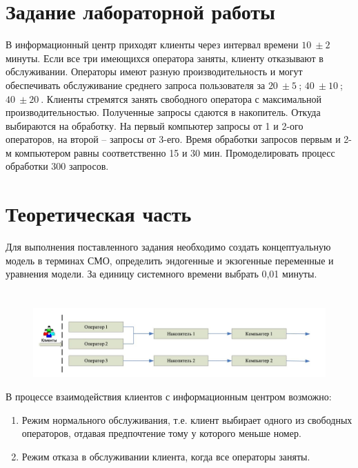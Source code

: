 \documentclass[12pt,a4paper,oneside]{report}
\begin{document}
\section*{Задание лабораторной работы}
\quad В информационный центр приходят клиенты через интервал времени $\SI{10}{} \pm \SI{2}{}$ минуты. Если все три имеющихся оператора заняты, клиенту отказывают в обслуживании. Операторы имеют разную производительность и могут обеспечивать обслуживание среднего запроса пользователя за $\SI{20}{} \pm \SI{5}{}$; $\SI{40}{} \pm \SI{10}{}$; $\SI{40}{} \pm \SI{20}{}$. Клиенты стремятся занять свободного оператора с максимальной производительностью. Полученные запросы сдаются в накопитель. Откуда выбираются на обработку. На первый компьютер запросы от 1 и 2-ого операторов, на второй – запросы от 3-его. Время обработки запросов первым и 2-м компьютером равны соответственно 15 и 30 мин. Промоделировать процесс обработки 300 запросов. 


\section*{Теоретическая часть}
\quad Для выполнения поставленного задания необходимо создать концептуальную модель в терминах СМО, определить эндогенные и экзогенные переменные и уравнения модели. За единицу системного времени выбрать 0,01 минуты.

\section*{}
\begin{figure}[!h]
	\centering
	\includegraphics[scale=0.55]{teor_1.jpg}
	\label{fig:screenshot001}
\end{figure}

\quad В процессе взаимодействия клиентов с информационным центром возможно:

\begin{enumerate} 
  \item Режим нормального обслуживания, т.е. клиент выбирает одного из свободных операторов, отдавая предпочтение тому у которого меньше номер.
  \item Режим отказа в обслуживании клиента, когда все операторы заняты. 
\end{enumerate}
\end{document}
